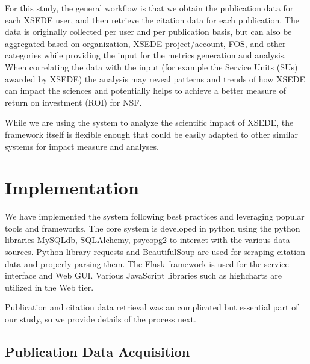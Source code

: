 \documentclass{sig-alternate}
\begin{document}
For this study, the general workflow is that we obtain the publication data for each XSEDE user, and then retrieve the citation data for each publication. The data is originally collected per user and per publication basis, but can also be aggregated based on organization, XSEDE project/account, FOS, and other categories while providing the input for the metrics generation and analysis. When correlating the data with the input (for example the Service Units (SUs) awarded by XSEDE) the analysis may reveal patterns and trends of how XSEDE can impact the sciences and potentially helps to achieve a better measure of return on investment (ROI) for NSF. 
 
While we are using the system to analyze the scientific impact of XSEDE, the framework itself is flexible enough that could be easily adapted to other similar systems for impact measure and analyses. 
 
 
\section{Implementation} \label{S:implementation}
 
We have implemented the system following best practices and leveraging popular tools and frameworks. The core system is developed in python using the  python libraries MySQLdb, SQLAlchemy, psycopg2 to interact with the various data sources. Python library requests and BeautifulSoup are used for scraping citation data and properly parsing them. The Flask framework is used for the service interface and Web GUI. Various JavaScript libraries such as highcharts are utilized in the Web tier. 
 
Publication and citation data retrieval was an complicated but essential part of our study, so we provide details of the process next. 
 
\subsection{Publication Data Acquisition} 
 
\end{document}

